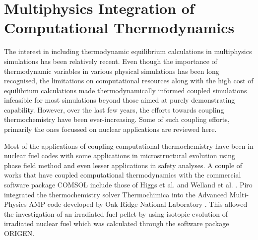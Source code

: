 
\section{Multiphysics Integration of Computational Thermodynamics}

	The interest in including thermodynamic equilibrium calculations in multiphysics simulations has been relatively recent. Even though the importance of thermodynamic variables in various physical simulations has been long recognised, the limitations on computational resources along with the high cost of equilibrium calculations made thermodynamically informed coupled simulations infeasible for most simulations beyond those aimed at purely demonstrating capability. However, over the last few years, the efforts towards coupling thermochemistry have been ever-increasing. Some of such coupling efforts, primarily the ones focussed on nuclear applications are reviewed here. 
	
	Most of the applications of coupling computational thermochemistry have been in nuclear fuel codes with some applications in microstructural evolution using phase field method and even lesser applications in safety analyses. A couple of works that have coupled computational thermodynamics with the commercial software package COMSOL include those of Higgs et al. \cite{Higgs:2007aa} and Welland et al. \cite{Welland09}. Piro integrated the thermochemistry solver {Thermochimica} into the Advanced Multi-Physics {AMP} code developed by Oak Ridge National Laboratory \cite{Piro11b}. This allowed the investigation of an irradiated fuel pellet by using isotopic evolution of irradiated nuclear fuel which was calculated through the software package {ORIGEN}. 

